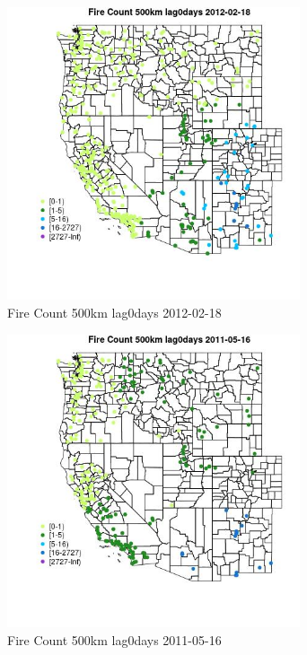 \begin{figure} 
\centering  
\includegraphics[width=0.77\textwidth]{Code_Outputs/Report_ML_input_PM25_Step4_part_f_de_duplicated_aves_prioritize_24hr_obswNAs_MapObsFire_Count_500km_lag0days2012-02-18.jpg} 
\caption{\label{fig:Report_ML_input_PM25_Step4_part_f_de_duplicated_aves_prioritize_24hr_obswNAsMapObsFire_Count_500km_lag0days2012-02-18}Fire Count 500km lag0days 2012-02-18} 
\end{figure} 
 

\begin{figure} 
\centering  
\includegraphics[width=0.77\textwidth]{Code_Outputs/Report_ML_input_PM25_Step4_part_f_de_duplicated_aves_prioritize_24hr_obswNAs_MapObsFire_Count_500km_lag0days2011-05-16.jpg} 
\caption{\label{fig:Report_ML_input_PM25_Step4_part_f_de_duplicated_aves_prioritize_24hr_obswNAsMapObsFire_Count_500km_lag0days2011-05-16}Fire Count 500km lag0days 2011-05-16} 
\end{figure} 
 

